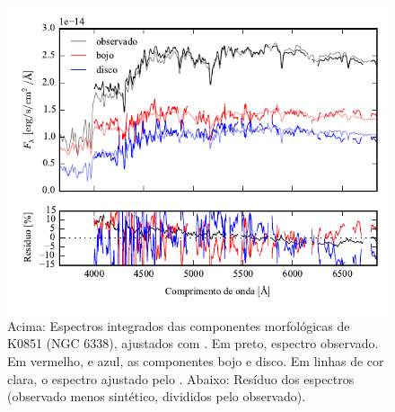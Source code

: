 \begin{figure}
	\includegraphics[page=13]{figuras/sample006a_synthesis}
	\caption[Espectros ajustados com \starlight das componentes morfológicas de
	K0851 (NGC 6338)]
	{Acima: Espectros integrados das componentes morfológicas de
	K0851 (NGC 6338), ajustados com \starlight. Em preto, espectro observado. Em
	vermelho, e azul, as componentes bojo e disco. Em linhas de cor clara, o
	espectro ajustado pelo \starlight. Abaixo: Resíduo dos espectros (observado
	menos sintético, divididos pelo observado).}
	\label{fig:decompSintese:K0851}
\end{figure}

